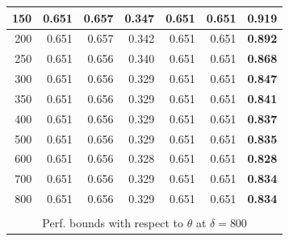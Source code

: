 \documentclass[letterpaper, 10 pt, conference]{ieeeconf}
\begin{document}
\begin{figure}[!h]
\begin{minipage}{\columnwidth}
{\begin{tabular}{|rrrrrrr|}
\multicolumn{1}{|r|}{150} & \multicolumn{1}{r|}{0.651} & \multicolumn{1}{r|}{0.657} & \multicolumn{1}{r|}{0.347} & \multicolumn{1}{r|}{0.651} & \multicolumn{1}{r|}{0.651} & \textbf{0.919} \\ \hline
\multicolumn{1}{|r|}{200} & \multicolumn{1}{r|}{0.651} & \multicolumn{1}{r|}{0.657} & \multicolumn{1}{r|}{0.342} & \multicolumn{1}{r|}{0.651} & \multicolumn{1}{r|}{0.651} & \textbf{0.892} \\ \hline
\multicolumn{1}{|r|}{250} & \multicolumn{1}{r|}{0.651} & \multicolumn{1}{r|}{0.656} & \multicolumn{1}{r|}{0.340} & \multicolumn{1}{r|}{0.651} & \multicolumn{1}{r|}{0.651} & \textbf{0.868} \\ \hline
\multicolumn{1}{|r|}{300} & \multicolumn{1}{r|}{0.651} & \multicolumn{1}{r|}{0.656} & \multicolumn{1}{r|}{0.329} & \multicolumn{1}{r|}{0.651} & \multicolumn{1}{r|}{0.651} & \textbf{0.847} \\ \hline
\multicolumn{1}{|r|}{350} & \multicolumn{1}{r|}{0.651} & \multicolumn{1}{r|}{0.656} & \multicolumn{1}{r|}{0.329} & \multicolumn{1}{r|}{0.651} & \multicolumn{1}{r|}{0.651} & \textbf{0.841} \\ \hline
\multicolumn{1}{|r|}{400} & \multicolumn{1}{r|}{0.651} & \multicolumn{1}{r|}{0.656} & \multicolumn{1}{r|}{0.329} & \multicolumn{1}{r|}{0.651} & \multicolumn{1}{r|}{0.651} & \textbf{0.837} \\ \hline
\multicolumn{1}{|r|}{500} & \multicolumn{1}{r|}{0.651} & \multicolumn{1}{r|}{0.656} & \multicolumn{1}{r|}{0.329} & \multicolumn{1}{r|}{0.651} & \multicolumn{1}{r|}{0.651} & \textbf{0.835} \\ \hline
\multicolumn{1}{|r|}{600} & \multicolumn{1}{r|}{0.651} & \multicolumn{1}{r|}{0.656} & \multicolumn{1}{r|}{0.328} & \multicolumn{1}{r|}{0.651} & \multicolumn{1}{r|}{0.651} & \textbf{0.828} \\ \hline
\multicolumn{1}{|r|}{700} & \multicolumn{1}{r|}{0.651} & \multicolumn{1}{r|}{0.656} & \multicolumn{1}{r|}{0.329} & \multicolumn{1}{r|}{0.651} & \multicolumn{1}{r|}{0.651} & \textbf{0.834} \\ \hline
\multicolumn{1}{|r|}{800} & \multicolumn{1}{r|}{0.651} & \multicolumn{1}{r|}{0.656} & \multicolumn{1}{r|}{0.329} & \multicolumn{1}{r|}{0.651} & \multicolumn{1}{r|}{0.651} & \textbf{0.834} \\ \hline
\multicolumn{7}{|l|}{\cellcolor[HTML]{C0C0C0}} \\ \hline
\multicolumn{7}{|c|}{Perf. bounds with respect to $\theta$ at $\delta=800$} \\ \hline

\end{tabular}}
\end{minipage}
\end{figure}
\end{document}
